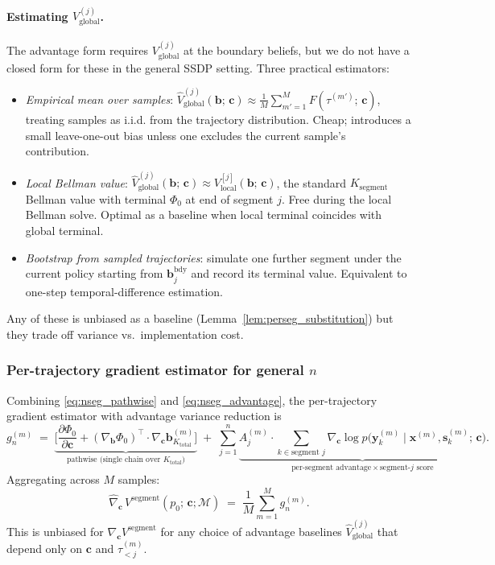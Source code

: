 \documentclass[11pt,a4paper]{article}
\newcommand{\bc}{\bm{c}}
\newcommand{\bx}{\bm{x}}
\newcommand{\by}{\bm{y}}
\newcommand{\bs}{\bm{s}}
\newcommand{\bb}{\bm{b}}
\begin{document}
\paragraph{Estimating $V_{\mathrm{global}}^{(j)}$.}  The advantage form requires
$V_{\mathrm{global}}^{(j)}$ at the boundary beliefs, but we do not have a closed form for
these in the general SSDP setting.  Three practical estimators:
\begin{itemize}[nosep, leftmargin=2em]
\item \emph{Empirical mean over samples}: $\widehat{V}_{\mathrm{global}}^{(j)}(\bb;\, \bc) \approx
  \frac{1}{M} \sum_{m'=1}^{M} F(\tau^{(m')};\, \bc)$, treating samples as i.i.d. from the trajectory
  distribution.  Cheap; introduces a small leave-one-out bias unless one excludes the current
  sample's contribution.
\item \emph{Local Bellman value}: $\widehat{V}_{\mathrm{global}}^{(j)}(\bb;\, \bc) \approx
  V^{[j]}_\mathrm{local}(\bb;\, \bc)$, the standard $K_\mathrm{segment}$ Bellman value with terminal
  $\Phi_0$ at end of segment $j$.  Free during the local Bellman solve.  Optimal as a baseline
  when local terminal coincides with global terminal.
\item \emph{Bootstrap from sampled trajectories}: simulate one further segment under the current
  policy starting from $\bb^{\mathrm{bdy}}_j$ and record its terminal value.  Equivalent to
  one-step temporal-difference estimation.
\end{itemize}
Any of these is unbiased as a baseline (Lemma~\ref{lem:perseg_substitution}) but they trade
off variance vs.\ implementation cost.

\subsubsection{Per-trajectory gradient estimator for general \texorpdfstring{$n$}{n}}
\label{sec:nseg_estimator}

Combining \eqref{eq:nseg_pathwise} and \eqref{eq:nseg_advantage}, the per-trajectory
gradient estimator with advantage variance reduction is
\begin{equation}
g^{(m)}_n
\;=\;
\underbrace{\biggl[\frac{\partial \Phi_0}{\partial \bc} + (\nabla_{\bb} \Phi_0)^\top \cdot \nabla_{\bc} \bb_{K_\mathrm{total}}^{(m)}\biggr]}_{\text{pathwise (single chain over } K_\mathrm{total}\text{)}}
\;+\;
\sum_{j=1}^{n} \underbrace{A_j^{(m)} \cdot \sum_{k \in \text{segment } j} \nabla_{\bc} \log p\bigl(\by_k^{(m)} \mid \bx^{(m)}, \bs_k^{(m)};\, \bc\bigr)}_{\text{per-segment advantage} \times \text{segment-} j \text{ score}}.
\label{eq:gm_nseg_full}
\end{equation}
Aggregating across $M$ samples:
\begin{equation}
\widehat{\nabla}_{\bc}\, V^\mathrm{segment}(p_0;\, \bc; \mathcal{M})
\;=\;
\frac{1}{M} \sum_{m=1}^{M} g^{(m)}_n.
\end{equation}
This is unbiased for $\nabla_{\bc} V^\mathrm{segment}$ for any choice of advantage baselines
$\widehat{V}_{\mathrm{global}}^{(j)}$ that depend only on $\bc$ and $\tau_{<j}^{(m)}$.
\end{document}
